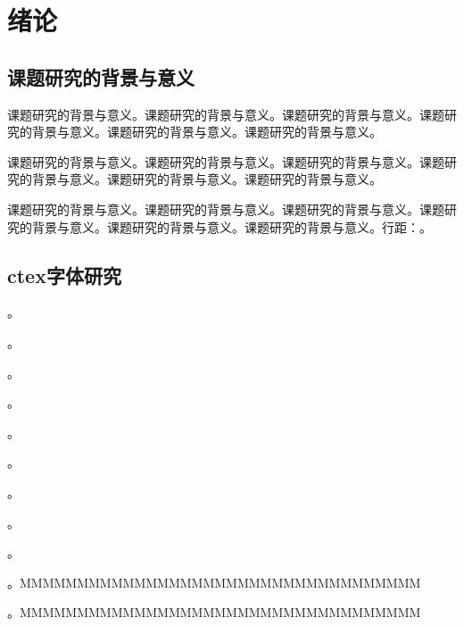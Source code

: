 \documentclass{csuthesis}
\begin{document}
    \tableofcontents
    
    \newpage
    \mainmatter
    
    \renewcommand{\chaptermark}[1]{\markboth{第\,\thechapter\,章\hspace{0.8em}#1}{}}
    
    \chapter{绪论}
    \thispagestyle{mainstyle} %
    \section{课题研究的背景与意义}

    课题研究的背景与意义。课题研究的背景与意义。课题研究的背景与意义。课题研究的背景与意义。课题研究的背景与意义。课题研究的背景与意义。

    课题研究的背景与意义。课题研究的背景与意义。课题研究的背景与意义。课题研究的背景与意义。课题研究的背景与意义。课题研究的背景与意义。

    课题研究的背景与意义。课题研究的背景与意义。课题研究的背景与意义。课题研究的背景与意义。课题研究的背景与意义。课题研究的背景与意义。行距：\the\baselineskip。
    
    \section{ctex字体研究}
    
    {\noindent {} 。}
    
    {\noindent {} 。}
    
    {\noindent {} 。}
    
    {\noindent {} 。}
    
    {\noindent {} 。}
    
    {\noindent {} 。}
    
    {\noindent {} 。}
    
    {\noindent {} 。}
    
    {\noindent {} 。}
    
    {\noindent {} 。MMMMMMMMMMMMMMMMMMMMMMMMMMMMMMMMMMM}
    
    \noindent {}。MMMMMMMMMMMMMMMMMMMMMMMMMMMMMMMMMMM
    
\end{document}
